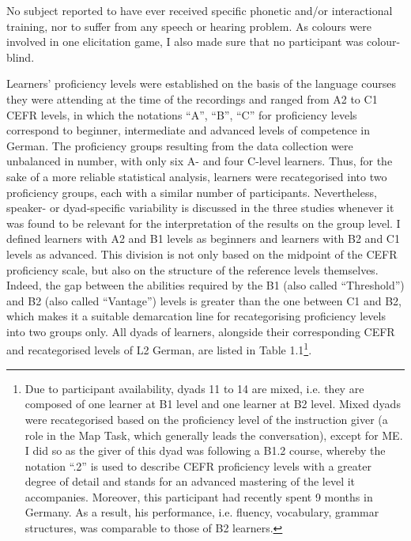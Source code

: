 \begin{styleStandard}
No subject reported to have ever received specific phonetic and/or interactional training, nor to suffer from any speech or hearing problem. As colours were involved in one elicitation game, I also made sure that no participant was colour-blind.
\end{styleStandard}

\begin{styleStandard}
Learners’ proficiency levels were established on the basis of the language courses they were attending at the time of the recordings and ranged from A2 to C1 CEFR levels, in which the notations “A”, “B”, “C” for proficiency levels correspond to beginner, intermediate and advanced levels of competence in German. The proficiency groups resulting from the data collection were unbalanced in number, with only six A- and four C-level learners. Thus, for the sake of a more reliable statistical analysis, learners were recategorised into two proficiency groups, each with a similar number of participants. Nevertheless, speaker- or dyad-specific variability is discussed in the three studies whenever it was found to be relevant for the interpretation of the results on the group level. I defined learners with A2 and B1 levels as beginners and learners with B2 and C1 levels as advanced. This division is not only based on the midpoint of the CEFR proficiency scale, but also on the structure of the reference levels themselves. Indeed, the gap between the abilities required by the B1 (also called “Threshold”) and B2 (also called “Vantage”) levels is greater than the one between C1 and B2, which makes it a suitable demarcation line for recategorising proficiency levels into two groups only. All dyads of learners, alongside their corresponding CEFR and recategorised levels of L2 German, are listed in Table 1.1\footnote{Due to participant availability, dyads 11 to 14 are mixed, i.e. they are composed of one learner at B1 level and one learner at B2 level. Mixed dyads were recategorised based on the proficiency level of the instruction giver (a role in the Map Task, which generally leads the conversation), except for ME. I did so as the giver of this dyad was following a B1.2 course, whereby the notation “.2” is used to describe CEFR proficiency levels with a greater degree of detail and stands for an advanced mastering of the level it accompanies. Moreover, this participant had recently spent 9 months in Germany. As a result, his performance, i.e. fluency, vocabulary, grammar structures, was comparable to those of B2 learners.}.
\end{styleStandard}

